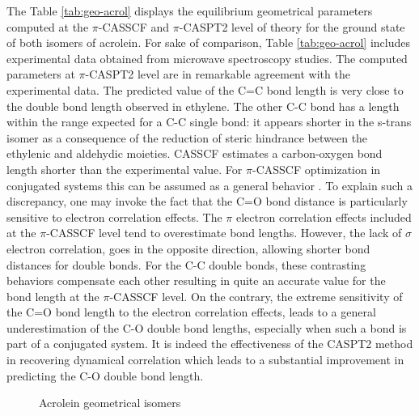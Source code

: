 The Table \ref{tab:geo-acrol} displays the equilibrium geometrical 
parameters computed at the $\pi$-CASSCF and $\pi$-CASPT2 
level of theory
for the ground state of both isomers of acrolein. For sake of comparison, 
Table \ref{tab:geo-acrol} includes
experimental data obtained from microwave spectroscopy
studies\cite{Blom:82}. The computed parameters at $\pi$-CASPT2 level are in 
remarkable agreement with the experimental
data. The predicted value of the C=C bond length is very close to the double bond length
observed in ethylene. The other C-C bond has a length within the range expected 
for a C-C single bond: it appears shorter in the s-trans isomer as a consequence
of the reduction of steric hindrance between the ethylenic and aldehydic
moieties. CASSCF estimates a carbon-oxygen bond length shorter
than the experimental value. For
$\pi$-CASSCF optimization in conjugated systems this can be assumed as a general
behavior \cite{Molina:01b,Pou:99}. To explain such
a discrepancy, one may invoke the fact that the C=O bond distance is
particularly sensitive to electron correlation effects. The $\pi$ electron 
correlation effects included at the $\pi$-CASSCF level tend to overestimate bond
lengths. However, the lack of $\sigma$ electron correlation, goes
in the opposite direction, allowing shorter bond distances for double bonds.
For the C-C double bonds, these contrasting behaviors compensate each other 
\cite{Page:99} resulting in quite an accurate value for the bond length at the 
$\pi$-CASSCF level. On the contrary, the extreme sensitivity of the C=O
bond length to the electron correlation effects, leads to a general
underestimation of the C-O double bond lengths, especially when such
a bond is part of a conjugated system. It is indeed the effectiveness of the CASPT2
method in recovering dynamical correlation which leads to a substantial improvement
in predicting the C-O double bond length.

\begin{figure}
\begin{center}
\caption{Acrolein geometrical isomers}
\label{fig:cis-trans}
\end{center}
\end{figure}

